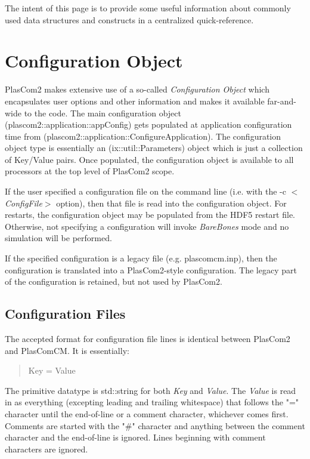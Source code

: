 The intent of this page is to provide some useful information about commonly used data structures and constructs in a centralized quick-\/reference.\hypertarget{developer_reference_config}{}\section{Configuration Object}\label{developer_reference_config}
Plas\+Com2 makes extensive use of a so-\/called {\itshape Configuration Object} which encapsulates user options and other information and makes it available far-\/and-\/wide to the code. The main configuration object (plascom2\+::application\+::app\+Config) gets populated at application configuration time from (plascom2\+::application\+::\+Configure\+Application). The configuration object type is essentially an (ix\+::util\+::\+Parameters) object which is just a collection of Key/\+Value pairs. Once populated, the configuration object is available to all processors at the top level of Plas\+Com2 scope.

If the user specified a configuration file on the command line (i.\+e. with the -\/c $<${\itshape Config\+File}$>$ option), then that file is read into the configuration object. For restarts, the configuration object may be populated from the H\+D\+F5 restart file. Otherwise, not specifying a configuration will invoke {\itshape Bare\+Bones} mode and no simulation will be performed.

If the specified configuration is a legacy file (e.\+g. plascomcm.\+inp), then the configuration is translated into a Plas\+Com2-\/style configuration. The legacy part of the configuration is retained, but not used by Plas\+Com2.\hypertarget{developer_reference_configfile}{}\subsection{Configuration Files}\label{developer_reference_configfile}
The accepted format for configuration file lines is identical between Plas\+Com2 and Plas\+Com\+CM. It is essentially\+:~\newline
 \begin{quote}
Key = Value ~\newline
\end{quote}


The primitive datatype is std\+::string for both {\itshape Key} and {\itshape Value}. The {\itshape Value} is read in as everything (excepting leading and trailing whitespace) that follows the "=" character until the end-\/of-\/line or a comment character, whichever comes first. Comments are started with the "\#" character and anything between the comment character and the end-\/of-\/line is ignored. Lines beginning with comment characters are ignored.

